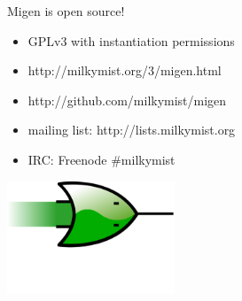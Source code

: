\documentclass[serif,mathserif]{beamer}
\begin{document}
\begin{frame}
Migen is open source!
\begin{itemize}
\item GPLv3 with instantiation permissions
\item http://milkymist.org/3/migen.html
\item http://github.com/milkymist/migen
\item mailing list: http://lists.milkymist.org
\item IRC: Freenode \#milkymist
\end{itemize}

\centering \includegraphics[width=5cm]{migen_logo.png}

\end{frame}
\end{document}
